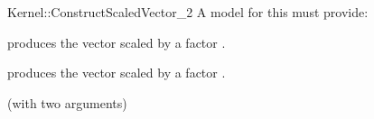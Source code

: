 \begin{ccRefFunctionObjectConcept}{Kernel::ConstructScaledVector_2}
A model for this must provide:


            {produces the vector  scaled by a factor .}

            {produces the vector  scaled by a factor .}

\ccRefines
{} (with two arguments)

\ccSeeAlso
{}\\

\end{ccRefFunctionObjectConcept}
